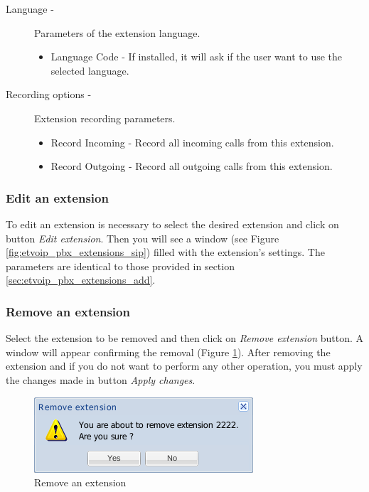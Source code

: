 \begin{description}
\begin{description}
            \item[Language -] Parameters of the extension language.
                \begin{itemize}
                    \item Language Code - If installed, it will ask if the user want to use the selected language.
                \end{itemize}

            \item[Recording options -] Extension recording parameters.
                \begin{itemize}
                    \item Record Incoming - Record all incoming calls from this extension.
                    \item Record Outgoing - Record all outgoing calls from this extension.
                \end{itemize}
            
        \end{description}
\end{description}

\subsubsection{Edit an extension}

To edit an extension is necessary to select the desired extension and click on button \emph{Edit extension}. Then you will see a window (see Figure \ref{fig:etvoip_pbx_extensions_sip}) filled with the extension's settings.
The parameters are identical to those provided in section \ref{sec:etvoip_pbx_extensions_add}.

\subsubsection{Remove an extension}
Select the extension to be removed and then click on \emph{Remove extension} button.
A window will appear confirming the removal (Figure \ref{fig:etvoip_pbx_extensions_remove}). After removing the extension and if you do not want to perform any other operation, you must apply the changes made in button \emph{Apply changes}.

\begin{figure}[H]
        \begin{center}
        \includegraphics[scale=0.6]{screenshots/etvoip_pbx_extensions_remove.png}
        \caption{Remove an extension}
        \label{fig:etvoip_pbx_extensions_remove}
        \end{center}
\end{figure}

